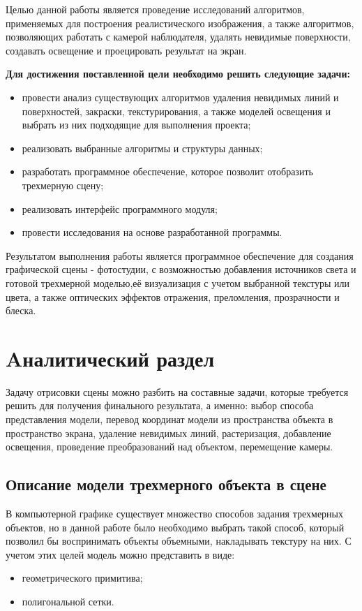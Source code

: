 \documentclass[12pt,a4paper,oneside]{report}
\begin{document}
	 Целью данной работы является проведение исследований алгоритмов, применяемых для построения реалистического изображения, а также алгоритмов, позволяющих работать с камерой наблюдателя, удалять невидимые поверхности, создавать освещение и проецировать результат на экран.
	
	 \textbf{Для достижения поставленной цели необходимо решить следующие задачи: } 
	
	\begin{itemize}
		\item провести анализ существующих алгоритмов удаления невидимых линий и поверхностей, закраски, текстурирования, а также моделей освещения и выбрать из них подходящие для выполнения проекта;
		\item реализовать выбранные алгоритмы и структуры данных;
		\item разработать программное обеспечение, которое позволит отобразить трехмерную сцену;
		\item реализовать интерфейс программного модуля;
		\item провести исследования на основе разработанной программы. 
		
	\end{itemize}

	Результатом выполнения работы является программное обеспечение для создания графической сцены - фотостудии, с возможностью добавления источников света и готовой трехмерной моделью,её визуализация с учетом выбранной текстуры или цвета, а также оптических эффектов отражения, преломления, прозрачности и блеска. 
	
 	\chapter {Aналитический раздел}
 	
 	 \quad Задачу отрисовки сцены можно разбить на составные задачи, которые требуется решить для получения финального результата, а именно: выбор способа представления модели, перевод координат модели из пространства объекта в пространство экрана, удаление невидимых линий, растеризация, добавление освещения, проведение преобразований над объектом, перемещение камеры.
 	  
 		 
 	\section{Описание модели трехмерного объекта в сцене}
 	
 	 \quad В компьютерной графике существует множество способов задания трехмерных объектов, но в данной работе было необходимо выбрать такой способ, который позволил бы воспринимать объекты объемными, накладывать текстуру на них. С учетом этих целей модель можно представить в виде:
 	\begin{itemize}
 		\item геометрического примитива;
 		\item полигональной сетки.
 	\end{itemize}
\end{document}
